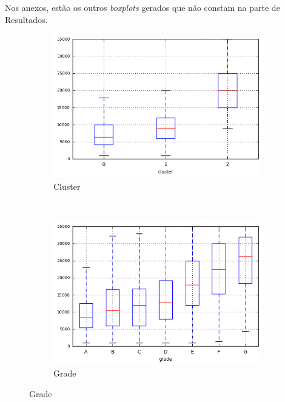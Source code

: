 \begin{anexosenv}
Nos anexos, estão os outros \emph{boxplots} gerados que não constam na parte de Resultados.

\begin{figure}[!ht]
    \centering
        \caption{\emph{Boxplots} de funded\textunderscore amnt }
        \begin{subfigure}[t]{0.45\textwidth}
            \centering
            \caption{Cluster }

            \centerline{\includegraphics[width=1\textwidth]{img/funded_amnt_by_cluster}}
        \end{subfigure}%
        ~ 
        \begin{subfigure}[t]{0.45\textwidth}
            \centering
            \caption{Grade }
   
            \centerline{\includegraphics[width=1\textwidth]{img/funded_amnt_by_grade}}


\end{subfigure}
\end{figure}
\end{anexosenv}
